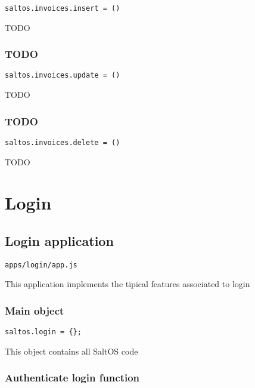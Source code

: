\documentclass[a4paper]{book}
\begin{document}
\begin{lstlisting}
saltos.invoices.insert = ()
\end{lstlisting}

TODO

\hypertarget{toc583}{}
\subsection{TODO}

\begin{lstlisting}
saltos.invoices.update = ()
\end{lstlisting}

TODO

\hypertarget{toc584}{}
\subsection{TODO}

\begin{lstlisting}
saltos.invoices.delete = ()
\end{lstlisting}

TODO


\hypertarget{toc585}{}
\chapter{Login}

\hypertarget{toc586}{}
\section{Login application}

\begin{lstlisting}
apps/login/app.js
\end{lstlisting}

This application implements the tipical features associated to login

\hypertarget{toc587}{}
\subsection{Main object}

\begin{lstlisting}
saltos.login = {};
\end{lstlisting}

This object contains all SaltOS code

\hypertarget{toc588}{}
\subsection{Authenticate login function}
\end{document}
